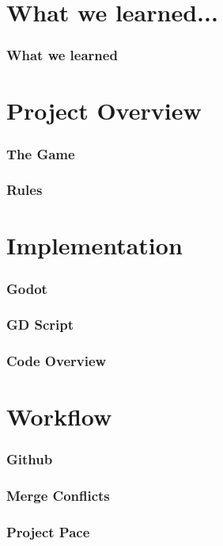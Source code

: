\documentclass{beamer}
\begin{document}
\section{What we learned...}
\begin{frame}
  \frametitle{What we learned}
\end{frame}






\section{Project Overview}
\begin{frame}
    \frametitle{The Game}
\end{frame}

\begin{frame}
    \frametitle{Rules}
\end{frame}


\section{Implementation}
\begin{frame}
    \frametitle{Godot}
\end{frame}

\begin{frame}
    \frametitle{GD Script}
\end{frame}

\begin{frame}
    \frametitle{Code Overview}
\end{frame}


\section{Workflow}
\begin{frame}
    \frametitle{Github}
\end{frame}

\begin{frame}
    \frametitle{Merge Conflicts}
\end{frame}

\begin{frame}
    \frametitle{Project Pace}
\end{frame}
\end{document}
